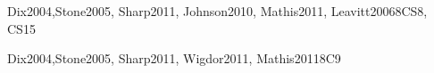\begin{syllabus}
\begin{unit}{\HCIDesigningInteraction}{}{Dix2004,Stone2005, Sharp2011, Johnson2010, Mathis2011, Leavitt2006}{8}{CS8, CS15}
\begin{topics}
    \item \HCIDesigningInteractionTopicPrinciplesOf
    \item \HCIDesigningInteractionTopicElements
    \item \HCIDesigningInteractionTopicHandling
    \item \HCIDesigningInteractionTopicUser
    \item \HCIProgrammingInteractiveSystemsTopicPresenting
    \item \HCIProgrammingInteractiveSystemsTopicInterface
    \item \HCIProgrammingInteractiveSystemsTopicWidget
    \item \HCIUsercentereddesignandtestingTopicInternationalization
    \item \HCIProgrammingInteractiveSystemsTopicChoosing
\end{topics}
\begin{learningoutcomes}
    \item \HCIDesigningInteractionLOCreateATogether [\Usage]
\end{learningoutcomes}
\end{unit}

\begin{unit}{\HCINewInteractiveTechnologies}{}{Dix2004,Stone2005, Sharp2011, Wigdor2011, Mathis2011}{8}{C9}
\begin{topics}
	\item \HCINewInteractiveTechnologiesTopicChoosing
	\item \HCINewInteractiveTechnologiesTopicApproachesTo
	\item \HCIMixedAugmentedandVirtualRealityTopicOutput
	\item \HCIMixedAugmentedandVirtualRealityTopicSystem
\end{topics}
\begin{learningoutcomes}
	\item \HCINewInteractiveTechnologiesLODescribeWhen [\Familiarity]
	\item \HCINewInteractiveTechnologiesLOUnderstandThe [\Familiarity]
	\item \HCINewInteractiveTechnologiesLODiscussTheDisadvantages [\Usage]
	\item \HCIMixedAugmentedandVirtualRealityLODescribeTheRealized [\Familiarity]
	\item \HCIMixedAugmentedandVirtualRealityLODescribeTheDifferentTechnologies [\Familiarity]
	\item \HCIMixedAugmentedandVirtualRealityLODetermineThe [\Assessment]
\end{learningoutcomes}
\end{unit}


\end{syllabus}
